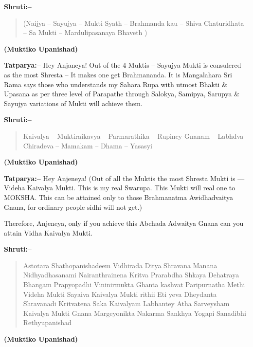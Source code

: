 \textbf{Shruti:–}

\begin{verse}
(Naijya – Sayujya – Mukti Syath – Brahmanda kau – Shiva Chaturidhata – Sa Mukti – Mardulipasanaya Bhaveth )
\end{verse}

\begin{flushright}
\textbf{(Muktiko Upanishad)}
\end{flushright}

\textbf{Tatparya:–} Hey Anjaneya! Out of the 4 Muktis – Sayujya Mukti is consulered as the most Shresta – It makes one get Brahmananda. It is Mangalahara Sri Rama says those who understands my Sahara Rupa with utmost Bhakti \& Upasana as per three level of Parapathe through Salokya, Samipya, Sarupya \& Sayujya variations of Mukti will achieve them.

\textbf{Shruti:–}

\begin{verse}
Kaivalya – Muktiraikavya – Parmarathika – Rupiney  Gnanam – Labhdva – Chiradeva – Mamakam – Dhama – Yasasyi 
\end{verse}

\begin{flushright}
\textbf{(Muktiko Upanishad)}
\end{flushright}

\textbf{Tatparya:–} Hey Anjeneya! (Out of all the Muktis the most Shresta Mukti is — Videha Kaivalya Mukti. This is my real Swarupa. This Mukti will real one to MOKSHA. This can be attained only to those Brahmanatma Awidhadvaitya Gnana, for ordinary people sidhi will not get.)

Therefore, Anjeneya, only if you achieve this Abchada Adwaitya Gnana can you attain Vidha Kaivalya Mukti.

\textbf{Shruti:–}

\begin{verse}
Astotara Shathopanishadeem Vidhirada Ditya Shravana Manana Nidhyadhasanami Nairanthrainena Kritva  Prarabdha Shkaya Dehatraya Bhangam Prapyopadhi Vininirmukta Ghanta kashvat Paripurnatha Methi Videha Mukti Sayaiva Kaivalya Mukti rithii  Eti yeva Dheydanta Shravanadi Kritvatena Saka Kaivalyam Labhantey  Atha Sarveysham Kaivalya Mukti Gnana Margeyonikta Nakarma Sankhya Yogapi Sanadibhi Rethyupanishad 
\end{verse}

\begin{flushright}
\textbf{(Muktiko Upanishad)}
\end{flushright}

